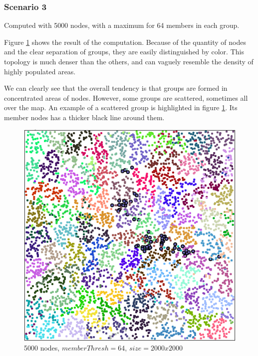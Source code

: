 \subsubsection{Scenario 3}
Computed with 5000 nodes, with a maximum for 64 members in each group. 

Figure \ref{fig:2000_64} shows the result of the computation. Because of the quantity
of nodes and the clear separation of groups, they are easily distinguished by color.
This topology is much denser than the others, and can vaguely resemble the density of highly populated areas.

We can clearly see that the overall tendency is that groups are formed
in concentrated areas of nodes. However, some groups are scattered, sometimes
all over the map. An example of a scattered group is highlighted
in figure \ref{fig:2000_64}. Its  member nodes has a thicker black line around them. 
\begin{figure}
\center
\includegraphics[scale=0.45]{Images/scenario3alt.png}
\caption{5000 nodes, $memberThresh=64$, $size=2000x2000$}
\label{fig:2000_64}
\end{figure}






%




